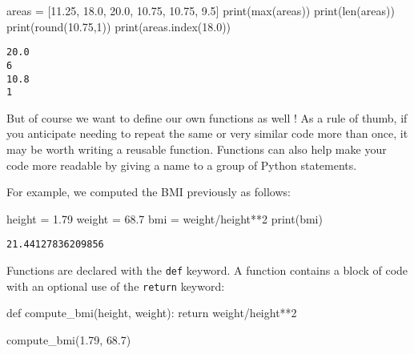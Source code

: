 \documentclass[
  letterpaper,
  DIV=11,
  numbers=noendperiod]{scrreprt}
\newenvironment{Shaded}{\begin{snugshade}}{\end{snugshade}}
\newcommand{\BuiltInTok}[1]{\textcolor[rgb]{0.00,0.23,0.31}{#1}}
\newcommand{\ControlFlowTok}[1]{\textcolor[rgb]{0.00,0.23,0.31}{#1}}
\newcommand{\DecValTok}[1]{\textcolor[rgb]{0.68,0.00,0.00}{#1}}
\newcommand{\FloatTok}[1]{\textcolor[rgb]{0.68,0.00,0.00}{#1}}
\newcommand{\KeywordTok}[1]{\textcolor[rgb]{0.00,0.23,0.31}{#1}}
\newcommand{\NormalTok}[1]{\textcolor[rgb]{0.00,0.23,0.31}{#1}}
\newcommand{\OperatorTok}[1]{\textcolor[rgb]{0.37,0.37,0.37}{#1}}
\begin{document}
\begin{Shaded}
\begin{Highlighting}[]
\NormalTok{areas }\OperatorTok{=}\NormalTok{ [}\FloatTok{11.25}\NormalTok{, }\FloatTok{18.0}\NormalTok{, }\FloatTok{20.0}\NormalTok{, }\FloatTok{10.75}\NormalTok{, }\FloatTok{10.75}\NormalTok{, }\FloatTok{9.5}\NormalTok{]}
\BuiltInTok{print}\NormalTok{(}\BuiltInTok{max}\NormalTok{(areas))}
\BuiltInTok{print}\NormalTok{(}\BuiltInTok{len}\NormalTok{(areas))}
\BuiltInTok{print}\NormalTok{(}\BuiltInTok{round}\NormalTok{(}\FloatTok{10.75}\NormalTok{,}\DecValTok{1}\NormalTok{))}
\BuiltInTok{print}\NormalTok{(areas.index(}\FloatTok{18.0}\NormalTok{))}
\end{Highlighting}
\end{Shaded}

\begin{verbatim}
20.0
6
10.8
1
\end{verbatim}

But of course we want to define our own functions as well ! As a rule of
thumb, if you anticipate needing to repeat the same or very similar code
more than once, it may be worth writing a reusable function. Functions
can also help make your code more readable by giving a name to a group
of Python statements.

For example, we computed the BMI previously as follows:

\begin{Shaded}
\begin{Highlighting}[]
\NormalTok{height }\OperatorTok{=} \FloatTok{1.79}
\NormalTok{weight }\OperatorTok{=} \FloatTok{68.7}
\NormalTok{bmi }\OperatorTok{=}\NormalTok{ weight}\OperatorTok{/}\NormalTok{height}\OperatorTok{**}\DecValTok{2}
\BuiltInTok{print}\NormalTok{(bmi)}
\end{Highlighting}
\end{Shaded}

\begin{verbatim}
21.44127836209856
\end{verbatim}

Functions are declared with the \texttt{def} keyword. A function
contains a block of code with an optional use of the \texttt{return}
keyword:

\begin{Shaded}
\begin{Highlighting}[]
\KeywordTok{def}\NormalTok{ compute\_bmi(height, weight):}
    \ControlFlowTok{return}\NormalTok{ weight}\OperatorTok{/}\NormalTok{height}\OperatorTok{**}\DecValTok{2}

\NormalTok{compute\_bmi(}\FloatTok{1.79}\NormalTok{, }\FloatTok{68.7}\NormalTok{)}
\end{Highlighting}
\end{Shaded}
\end{document}

